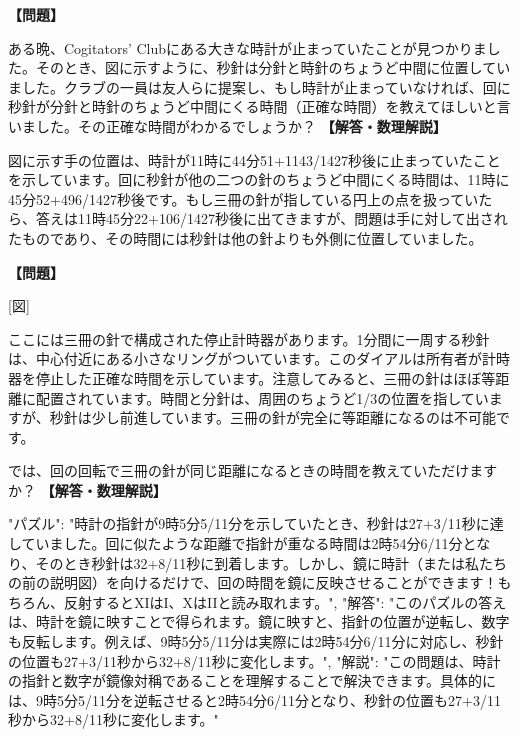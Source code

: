 \documentclass[10pt,a4paper,oneside,openany]{ltjsbook}
\begin{document}
\begin{tcolorbox}[colback=softblue,colframe=primaryblue,title=\textbf{第 62 問：クラブの時計 （原題: THE CLUB CLOCK.）},arc=2mm,boxrule=1pt,breakable]
\textbf{【問題】}\par\vspace{0.3em}
ある晩、Cogitators' Clubにある大きな時計が止まっていたことが見つかりました。そのとき、図に示すように、秒針は分針と時針のちょうど中間に位置していました。クラブの一員は友人らに提案し、もし時計が止まっていなければ、回に秒針が分針と時針のちょうど中間にくる時間（正確な時間）を教えてほしいと言いました。その正確な時間がわかるでしょうか？
\tcblower
\textbf{【解答・数理解説】}\par\vspace{0.3em}
図に示す手の位置は、時計が11時に44分51+1143/1427秒後に止まっていたことを示しています。回に秒針が他の二つの針のちょうど中間にくる時間は、11時に45分52+496/1427秒後です。もし三冊の針が指している円上の点を扱っていたら、答えは11時45分22+106/1427秒後に出てきますが、問題は手に対して出されたものであり、その時間には秒針は他の針よりも外側に位置していました。
\end{tcolorbox}

\begin{tcolorbox}[colback=softblue,colframe=primaryblue,title=\textbf{第 63 問：THE STOP-WATCH.},arc=2mm,boxrule=1pt,breakable]
\textbf{【問題】}\par\vspace{0.3em}

[図]

ここには三冊の針で構成された停止計時器があります。1分間に一周する秒針は、中心付近にある小さなリングがついています。このダイアルは所有者が計時器を停止した正確な時間を示しています。注意してみると、三冊の針はほぼ等距離に配置されています。時間と分針は、周囲のちょうど1/3の位置を指していますが、秒針は少し前進しています。三冊の針が完全に等距離になるのは不可能です。

では、回の回転で三冊の針が同じ距離になるときの時間を教えていただけますか？
\tcblower
\textbf{【解答・数理解説】}\par\vspace{0.3em}
{
"パズル": "時計の指針が9時5分5/11分を示していたとき、秒針は27+3/11秒に達していました。回に似たような距離で指針が重なる時間は2時54分6/11分となり、そのとき秒針は32+8/11秒に到着します。しかし、鏡に時計（または私たちの前の説明図）を向けるだけで、回の時間を鏡に反映させることができます！もちろん、反射するとXIはI、XはIIと読み取れます。",
"解答": "このパズルの答えは、時計を鏡に映すことで得られます。鏡に映すと、指針の位置が逆転し、数字も反転します。例えば、9時5分5/11分は実際には2時54分6/11分に対応し、秒針の位置も27+3/11秒から32+8/11秒に変化します。",
"解説": "この問題は、時計の指針と数字が鏡像対稱であることを理解することで解決できます。具体的には、9時5分5/11分を逆転させると2時54分6/11分となり、秒針の位置も27+3/11秒から32+8/11秒に変化します。"
}
\end{tcolorbox}
\end{document}
